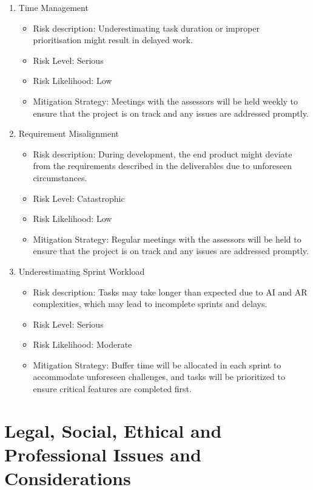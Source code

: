 \documentclass[10pt]{article}
\begin{document}
\begin{enumerate}
        \item{Time Management}
        \begin{itemize}
            \item Risk description: Underestimating task duration or improper prioritisation might result in delayed work.
            \item Risk Level: Serious
            \item Risk Likelihood: Low
            \item Mitigation Strategy: Meetings with the assessors will be held weekly to ensure that the project is on track and any issues are addressed promptly.
        \end{itemize}

        \item{Requirement Misalignment}
        \begin{itemize}
            \item Risk description: During development, the end product might deviate from the requirements described in the deliverables due to unforeseen circumstances.
            \item Risk Level: Catastrophic
            \item Risk Likelihood: Low
            \item Mitigation Strategy: Regular meetings with the assessors will be held to ensure that the project is on track and any issues are addressed promptly.
        \end{itemize}

        \item{Underestimating Sprint Workload}
        \begin{itemize}
            \item Risk description: Tasks may take longer than expected due to AI and AR complexities, which may lead to incomplete sprints and delays.
            \item Risk Level: Serious
            \item Risk Likelihood: Moderate
            \item Mitigation Strategy: Buffer time will be allocated in each sprint to accommodate unforeseen challenges, and tasks will be prioritized to ensure critical features are completed first.
        \end{itemize}

        \end{enumerate}
        

\section{Legal, Social, Ethical and Professional Issues and Considerations}
\end{document}
